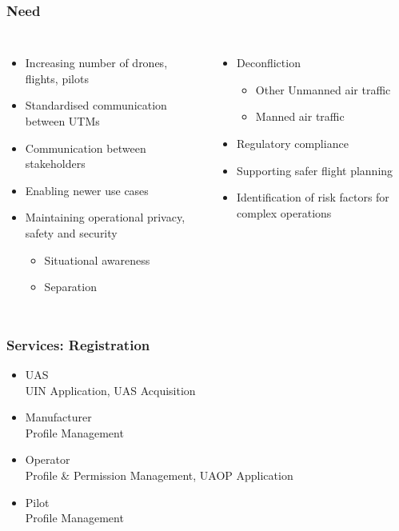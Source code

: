 \documentclass[usenames,dvipsnames,aspectratio=169,serif]{beamer}
\begin{document}
\begin{frame}
   \frametitle{Need}
   \begin{columns}[t]
      \begin{itemize}
         \item Increasing number of drones, flights, pilots
         \item Standardised communication between UTMs
         \item Communication between stakeholders
         \item Enabling newer use cases
         \item Maintaining operational privacy, safety and security
            \begin{itemize}
               \item Situational awareness
               \item Separation
            \end{itemize}
      \end{itemize}
      \begin{itemize}
         \item Deconfliction
            \begin{itemize}
               \item Other Unmanned air traffic
               \item Manned air traffic
            \end{itemize}
         \item Regulatory compliance
         \item Supporting safer flight planning
         \item Identification of risk factors for complex operations
      \end{itemize}
   \end{columns}

\end{frame}


\begin{frame}
   \frametitle{Services: Registration}
   \begin{itemize}
      \item UAS \\
         UIN Application, UAS Acquisition
      \item Manufacturer \\
         Profile Management

      \item Operator \\
         Profile \& Permission Management, UAOP Application

      \item Pilot \\
         Profile Management
   \end{itemize}
\end{frame}
\end{document}
